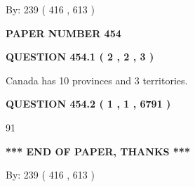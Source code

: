 \documentclass[12pt]{article}
\begin{document}
   
\hspace{1.0in} By: 
 239 ( 416 ,  613 )
   
   
   
   
\newpage 
\setcounter{page}{ 
   454001 } 
   
   
   
   
 {\textbf{ \Large{ PAPER NUMBER  454  }}}
   
   
\vspace{0.2in}
   
   
   
   
   
   
 \vspace{0.2in}
 
 
 
 
   
   
  
\vspace{0.2in}
  
{\textbf{\Large{QUESTION
454.1 
 ( 2 , 2 , 3 )
}}}
  
  
 
 
\noindent{}
 
 
Canada has 10  provinces and 3 territories.
 
 
 
 
  
\vspace{0.2in}
  
{\textbf{\Large{QUESTION
454.2 
 ( 1 , 1 , 6791 )
}}}
  
  
 
 
\noindent{}

91
 
 
   
   
 \vspace{0.2in}
 
   
   
   
   
\vspace{1.0in} 
{\textbf{\large{ *** END OF PAPER, THANKS *** }}} 
   
   
\hspace{1.0in} By: 
 239 ( 416 ,  613 )
   
   
   
   
\newpage 
\setcounter{page}{ 
   455001 } 
   
\end{document}
